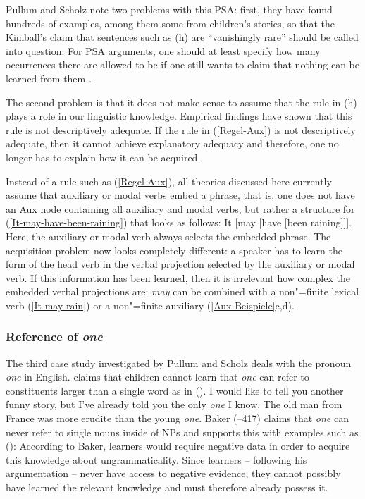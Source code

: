 Pullum and Scholz note two problems with this PSA: first, they have found hundreds of examples, among them some from
children's stories, so that the Kimball's claim that sentences such as (h) are ``vanishingly rare'' should
be called into question. For PSA arguments, one should at least specify how many occurrences there are allowed to be if one still wants to claim
that nothing can be learned from them \citep[]{PS2002a}. 

The second problem is that it does not make sense to assume that the rule in  (h) plays a role in our linguistic knowledge.
Empirical findings have shown that this rule is not descriptively adequate. If the rule in (\ref{Regel-Aux}) is not descriptively
adequate, then it cannot achieve explanatory adequacy and therefore, one no longer has to explain how it can be acquired.
  
Instead of a rule such as (\ref{Regel-Aux}), all theories discussed here currently assume that auxiliary or modal verbs embed a phrase, that is,
one does not have an Aux node containing all auxiliary and modal verbs, but rather a structure for (\ref{It-may-have-been-raining}) that looks
as follows:
\ea
It [may [have [been raining]]].
\z
Here, the auxiliary or modal verb always selects the embedded phrase. The acquisition problem now looks completely different: a speaker has to learn the form
of the head verb in the verbal projection selected by the auxiliary or modal verb. If this information has been learned, then it is irrelevant
how complex the embedded verbal projections are: \emph{may} can be combined with a non"=finite lexical verb (\ref{It-may-rain}) or a non"=finite
auxiliary (\ref{Aux-Beispiele}c,d).

\subsubsection{Reference of \emph{one}}

The third case study investigated by Pullum and Scholz deals with the pronoun \emph{one} in English.
\citet[--425, 327--340]{Baker78a-u} claims that children cannot learn that \emph{one} can refer to constituents
larger than a single word as in ().
\eal
\ex I would like to tell you another funny story, but I've already told you the only \emph{one} I
know.
\ex The old man from France was more erudite than the young \emph{one}.
\zl
Baker (--417) claims that \emph{one} can never refer to single nouns inside of NPs and supports this
with examples such as ():
\z
According to Baker, learners would require negative data in order to acquire this knowledge about ungrammaticality.
Since learners -- following his argumentation -- never have access to negative evidence, they cannot possibly have learned the relevant
knowledge and must therefore already possess it.

